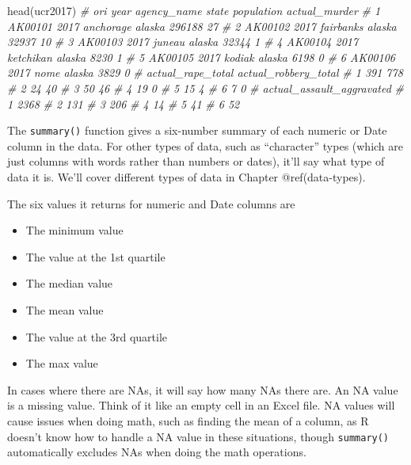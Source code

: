 \documentclass[
  a4paper,
]{krantz}
\makeatletter
\newenvironment{Shaded}{\begin{snugshade}}{\end{snugshade}}
\newcommand{\CommentTok}[1]{\textcolor[rgb]{0.56,0.35,0.01}{\textit{#1}}}
\newcommand{\FunctionTok}[1]{\textcolor[rgb]{0.00,0.00,0.00}{#1}}
\newcommand{\NormalTok}[1]{#1}
\providecommand{\tightlist}{%
  \setlength{\itemsep}{0pt}\setlength{\parskip}{0pt}}
\newenvironment{kframe}{%
\medskip{}
\setlength{\fboxsep}{.8em}
 \def\at@end@of@kframe{}%
 \ifinner\ifhmode%
  \def\at@end@of@kframe{\end{minipage}}%
  \begin{minipage}{\columnwidth}%
 \fi\fi%
 \def\FrameCommand##1{\hskip\@totalleftmargin \hskip-\fboxsep
 \colorbox{shadecolor}{##1}\hskip-\fboxsep
     \hskip-\linewidth \hskip-\@totalleftmargin \hskip\columnwidth}%
 \MakeFramed {\advance\hsize-\width
   \@totalleftmargin\z@ \linewidth\hsize
   \@setminipage}}%
 {\par\unskip\endMakeFramed%
 \at@end@of@kframe}
\renewenvironment{Shaded}{\begin{kframe}}{\end{kframe}}
\makeatother
\begin{document}
\begin{Shaded}
\begin{Highlighting}[]
\FunctionTok{head}\NormalTok{(ucr2017)}
\CommentTok{\#       ori year agency\_name  state population actual\_murder}
\CommentTok{\# 1 AK00101 2017   anchorage alaska     296188            27}
\CommentTok{\# 2 AK00102 2017   fairbanks alaska      32937            10}
\CommentTok{\# 3 AK00103 2017      juneau alaska      32344             1}
\CommentTok{\# 4 AK00104 2017   ketchikan alaska       8230             1}
\CommentTok{\# 5 AK00105 2017      kodiak alaska       6198             0}
\CommentTok{\# 6 AK00106 2017        nome alaska       3829             0}
\CommentTok{\#   actual\_rape\_total actual\_robbery\_total}
\CommentTok{\# 1               391                  778}
\CommentTok{\# 2                24                   40}
\CommentTok{\# 3                50                   46}
\CommentTok{\# 4                19                    0}
\CommentTok{\# 5                15                    4}
\CommentTok{\# 6                 7                    0}
\CommentTok{\#   actual\_assault\_aggravated}
\CommentTok{\# 1                      2368}
\CommentTok{\# 2                       131}
\CommentTok{\# 3                       206}
\CommentTok{\# 4                        14}
\CommentTok{\# 5                        41}
\CommentTok{\# 6                        52}
\end{Highlighting}
\end{Shaded}

The \texttt{summary()} function gives a six-number summary
of each numeric or Date column in the data. For other types
of data, such as ``character'' types (which are just columns
with words rather than numbers or dates), it'll say what
type of data it is. We'll cover different types of data in
Chapter @ref(data-types).

The six values it returns for numeric and Date columns are

\begin{itemize}
\tightlist
\item
  The minimum value
\item
  The value at the 1st quartile
\item
  The median value
\item
  The mean value
\item
  The value at the 3rd quartile
\item
  The max value
\end{itemize}

In cases where there are NAs, it will say how many NAs there
are. An NA value is a missing value. Think of it like an
empty cell in an Excel file. NA values will cause issues
when doing math, such as finding the mean of a column, as R
doesn't know how to handle a NA value in these situations,
though \texttt{summary()} automatically excludes NAs when
doing the math operations.
\end{document}
